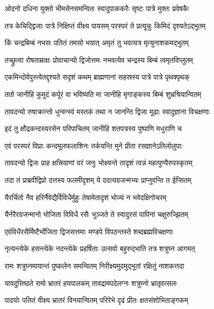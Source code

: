 \twolineshloka
{ओदनो दधिना युक्तो भीमसेनसमन्वितः}
{स्वादुपाककरैः सृष्टः पात्रे मुक्तः प्रवेषकैः}%

\twolineshloka
{तत्र केचिद्द्विजाः पात्रे निक्षिप्तं वीक्ष्य पायसम्}
{परस्परं ते प्रत्यूचुः किमिदं दृश्यतेऽद्भुतम्}%

\twolineshloka
{किं चन्द्रबिम्बं नभसः पतितं तमसो भयात्}
{अमृतं तु भवत्यत्र मृत्युनाशकमद्भुतम्}%

\twolineshloka
{तच्छ्रुत्वा रोषताम्राक्षः प्रोवाचान्यो द्विजोत्तमः}
{नभवत्येव चन्द्रस्य बिम्बं त्वमृतविप्लुतम्}%

\twolineshloka
{एकमिन्दोर्वपुस्त्वेतद्दृश्यते सदृशं कथम्}
{ब्राह्मणानां सहस्रस्य पात्रे पात्रे पृथक्पृथक्}%

\twolineshloka
{ततो जानीहि कुमुदं कर्पूरं वा भविष्यति}
{मा जानीहि मृगाङ्कस्य बिम्बं शुभ्रश्रियान्वितम्}%

\twolineshloka
{तावदन्यो रुषाक्रान्तो धुन्वन्स्वं मस्तकं तथा}
{न जानन्ति द्विजा मूढाः स्वादुज्ञाना विचक्षणाः}%

\twolineshloka
{इदं तु क्षौद्रकन्दस्यरसेन परिपाचितम्}
{जानीहि शतपत्रस्य पुष्पाणि मधुराणि च}%

\twolineshloka
{एवं परस्परं विप्राः कन्दमूलफलाशिनः}
{तर्कयन्ति मुने प्रीता रसज्ञानेऽतिलोलुपाः}%

\twolineshloka
{तावदन्यो द्विजः प्राह क्षत्त्रियाणां वरं जनुः}
{भोक्ष्यन्ते तादृशं त्वन्नं महत्पुण्यैरुपस्कृतम्}%

\twolineshloka
{तदा तं प्राब्रवीद्विप्रो दत्तस्य फलमीदृशम्}
{ये ददत्यग्रजन्मभ्यः प्राप्नुवन्ति त ईप्सितम्}%

\twolineshloka
{यैरर्चितो नैव हरिर्नैवेद्यैर्विविधैर्मुहुः}
{तेषामेतादृशं भोज्यं न भवेदक्षिगोचरम्}%

\twolineshloka
{यैर्नरैरग्रजन्मानो भोजिता विविधै रसैः}
{भुञ्जते ते स्वादुरसं पापिनां चक्षुरुज्झितम्}%

\twolineshloka
{एवंविधैरसैर्मिष्टैर्भोजिता द्विजसत्तमाः}
{मण्डपे विपठन्तस्ते शब्दब्रह्मविचक्षणाः}%

\twolineshloka
{नृत्यन्त्येके हसन्त्येके नदन्त्येके प्रहर्षिताः}
{उत्सवो बहुरुद्भाति तत्र शत्रुघ्न आगमत्}%

\twolineshloka
{रामः शत्रुघ्नमायान्तं पुष्कलेन समन्वितम्}
{निरीक्ष्यमुदमुद्भूतां रक्षितुं नाशकत्तदा}%

\twolineshloka
{यावदुत्तिष्ठते रामो भ्रातरं हयपालकम्}
{तावद्रामपदेलग्नः शत्रुघ्नो भ्रातृवत्सलः}%

\twolineshloka
{पादयोः पतितं वीक्ष्य भ्रातरं विनयान्वितम्}
{परिरेभे दृढं प्रीतः क्षतसंशोभिताङ्गकम्}%

